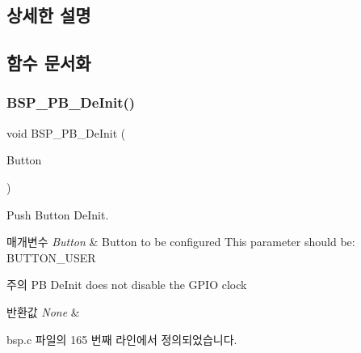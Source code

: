 \subsection{상세한 설명}


\subsection{함수 문서화}
\mbox{\label{group___s_t_m32_l1_x_x___n_u_c_l_e_o___b_u_t_t_o_n___functions_gac1bd746e7f6037d50ca3784ebe05686e}} 
\subsubsection{\texorpdfstring{B\+S\+P\+\_\+\+P\+B\+\_\+\+De\+Init()}{BSP\_PB\_DeInit()}}
{\footnotesize\ttfamily void B\+S\+P\+\_\+\+P\+B\+\_\+\+De\+Init (\begin{DoxyParamCaption}\item[{\mbox{\hyperlink{_lory_s_d_k__hw__conf_8h_a643816dfbad5c734fc25a29ce8d35bb1}{Button\+\_\+\+Type\+Def}}}]{Button }\end{DoxyParamCaption})}



Push Button De\+Init. 


\begin{DoxyParams}{매개변수}
{\em Button} & Button to be configured This parameter should be\+: B\+U\+T\+T\+O\+N\+\_\+\+U\+S\+ER ~\newline
\\
\hline
\end{DoxyParams}
\begin{DoxyNote}{주의}
PB De\+Init does not disable the G\+P\+IO clock 
\end{DoxyNote}

\begin{DoxyRetVals}{반환값}
{\em None} & \\
\hline
\end{DoxyRetVals}


bsp.\+c 파일의 165 번째 라인에서 정의되었습니다.



